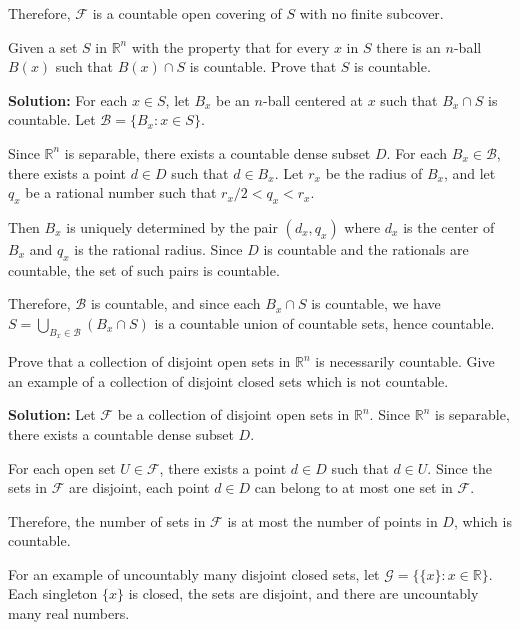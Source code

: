 Therefore, $\mathcal{F}$ is a countable open covering of $S$ with no finite subcover.

\begin{problembox}
Given a set \( S \) in \( \mathbb{R}^n \) with the property that for every \( x \) in \( S \) there is an \( n \)-ball \( B(x) \) such that \( B(x) \cap S \) is countable. Prove that \( S \) is countable.
\end{problembox}

\textbf{Solution:} For each $x \in S$, let $B_x$ be an $n$-ball centered at $x$ such that $B_x \cap S$ is countable. Let $\mathcal{B} = \{B_x : x \in S\}$.

Since $\mathbb{R}^n$ is separable, there exists a countable dense subset $D$. For each $B_x \in \mathcal{B}$, there exists a point $d \in D$ such that $d \in B_x$. Let $r_x$ be the radius of $B_x$, and let $q_x$ be a rational number such that $r_x/2 < q_x < r_x$.

Then $B_x$ is uniquely determined by the pair $(d_x, q_x)$ where $d_x$ is the center of $B_x$ and $q_x$ is the rational radius. Since $D$ is countable and the rationals are countable, the set of such pairs is countable.

Therefore, $\mathcal{B}$ is countable, and since each $B_x \cap S$ is countable, we have $S = \bigcup_{B_x \in \mathcal{B}} (B_x \cap S)$ is a countable union of countable sets, hence countable.

\begin{problembox}
Prove that a collection of disjoint open sets in \( \mathbb{R}^n \) is necessarily countable. Give an example of a collection of disjoint closed sets which is not countable.
\end{problembox}

\textbf{Solution:} Let $\mathcal{F}$ be a collection of disjoint open sets in $\mathbb{R}^n$. Since $\mathbb{R}^n$ is separable, there exists a countable dense subset $D$.

For each open set $U \in \mathcal{F}$, there exists a point $d \in D$ such that $d \in U$. Since the sets in $\mathcal{F}$ are disjoint, each point $d \in D$ can belong to at most one set in $\mathcal{F}$.

Therefore, the number of sets in $\mathcal{F}$ is at most the number of points in $D$, which is countable.

For an example of uncountably many disjoint closed sets, let $\mathcal{G} = \{\{x\} : x \in \mathbb{R}\}$. Each singleton $\{x\}$ is closed, the sets are disjoint, and there are uncountably many real numbers.

